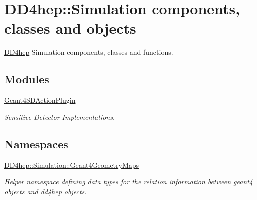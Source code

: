 \hypertarget{group___d_d4_h_e_p___s_i_m_u_l_a_t_i_o_n}{}\section{D\+D4hep\+:\+:Simulation components, classes and objects}
\label{group___d_d4_h_e_p___s_i_m_u_l_a_t_i_o_n}


\hyperlink{namespace_d_d4hep}{D\+D4hep} Simulation components, classes and functions.  


\subsection*{Modules}
\begin{DoxyCompactItemize}
\item 
\hyperlink{group___geant4_s_d_action_plugin}{Geant4\+S\+D\+Action\+Plugin}
\begin{DoxyCompactList}\small\item\em Sensitive Detector Implementations. \end{DoxyCompactList}\end{DoxyCompactItemize}
\subsection*{Namespaces}
\begin{DoxyCompactItemize}
\item 
 \hyperlink{namespace_d_d4hep_1_1_simulation_1_1_geant4_geometry_maps}{D\+D4hep\+::\+Simulation\+::\+Geant4\+Geometry\+Maps}
\begin{DoxyCompactList}\small\item\em Helper namespace defining data types for the relation information between geant4 objects and \hyperlink{namespacedd4hep}{dd4hep} objects. \end{DoxyCompactList}\end{DoxyCompactItemize}
